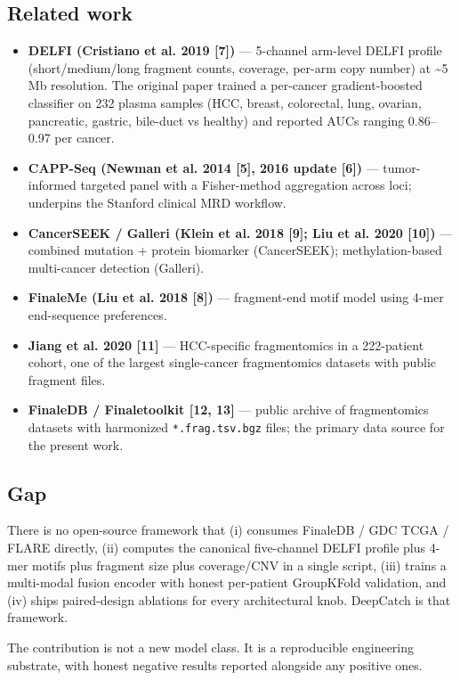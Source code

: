 \documentclass[11pt]{article}
\begin{document}
\subsection{Related work}
\begin{itemize}
\item
\textbf{DELFI (Cristiano et al. 2019 [7])} --- 5-channel arm-level DELFI profile (short/medium/long fragment counts, coverage, per-arm copy number) at \textasciitilde{}5 Mb resolution. The original paper trained a per-cancer gradient-boosted classifier on 232 plasma samples (HCC, breast, colorectal, lung, ovarian, pancreatic, gastric, bile-duct vs healthy) and reported AUCs ranging 0.86--0.97 per cancer.
\item
\textbf{CAPP-Seq (Newman et al. 2014 [5], 2016 update [6])} --- tumor-informed targeted panel with a Fisher-method aggregation across loci; underpins the Stanford clinical MRD workflow.
\item
\textbf{CancerSEEK / Galleri (Klein et al. 2018 [9]; Liu et al. 2020 [10])} --- combined mutation + protein biomarker (CancerSEEK); methylation-based multi-cancer detection (Galleri).
\item
\textbf{FinaleMe (Liu et al. 2018 [8])} --- fragment-end motif model using 4-mer end-sequence preferences.
\item
\textbf{Jiang et al. 2020 [11]} --- HCC-specific fragmentomics in a 222-patient cohort, one of the largest single-cancer fragmentomics datasets with public fragment files.
\item
\textbf{FinaleDB / Finaletoolkit [12, 13]} --- public archive of fragmentomics datasets with harmonized \texttt{*.frag.tsv.bgz} files; the primary data source for the present work.
\end{itemize}

\subsection{Gap}
There is no open-source framework that (i) consumes FinaleDB / GDC TCGA / FLARE directly, (ii) computes the canonical five-channel DELFI profile plus 4-mer motifs plus fragment size plus coverage/CNV in a single script, (iii) trains a multi-modal fusion encoder with honest per-patient GroupKFold validation, and (iv) ships paired-design ablations for every architectural knob. DeepCatch is that framework.

The contribution is not a new model class. It is a reproducible engineering substrate, with honest negative results reported alongside any positive ones.
\end{document}
